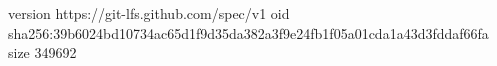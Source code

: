 version https://git-lfs.github.com/spec/v1
oid sha256:39b6024bd10734ac65d1f9d35da382a3f9e24fb1f05a01cda1a43d3fddaf66fa
size 349692
